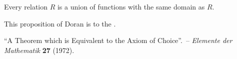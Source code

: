 \documentclass[12pt]{article}
\theoremstyle{definition}
\begin{document}
Every relation $R$ is a union of functions with the same domain as $R$.

This proposition of Doran is  to the .

\begin{thebibliography}{9}
 ``{A Theorem which is Equivalent to the Axiom of Choice}''. \,-- {\em Elemente der Mathematik} \textbf{27} (1972).
\end{thebibliography}
\end{document}
